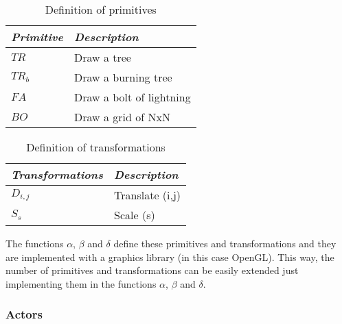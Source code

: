 \documentclass[10pt,journal,letterpaper,compsoc]{IEEEtran}
\begin{document}
\begin{table}[h]
\caption{Definition of primitives}
\label{table2}
\begin{center}
\begin{small}
\begin{tabular}{|l|l|}

\hline \itshape Primitive & \itshape Description\\
\hline $TR$ & Draw a tree\\
\hline $TR_b$ & Draw a burning tree\\
\hline $FA$ & Draw a bolt of lightning\\
\hline $BO$ & Draw a grid of NxN \\
\hline

\end{tabular}
\end{small}
\end{center}
\end{table}



\begin{table}[h]
\caption{Definition of transformations}
\label{table3}
\begin{center}
\begin{small}
\begin{tabular}{|l|l|}

\hline \itshape Transformations & \itshape Description\\
\hline $D_{i,j}$ & Translate (i,j)\\
\hline $S_{s}$ & Scale (s)\\
\hline

\end{tabular}
\end{small}
\end{center}
\end{table}

The functions ${\alpha}$, ${\beta}$ and ${\delta}$ define these primitives and transformations
and they are implemented with a graphics library (in this case OpenGL). This way, the number of
primitives and transformations can be easily extended just implementing them in the functions
${\alpha}$, ${\beta}$ and ${\delta}$.



\subsubsection{Actors
\label{sec:actors}}
\end{document}
